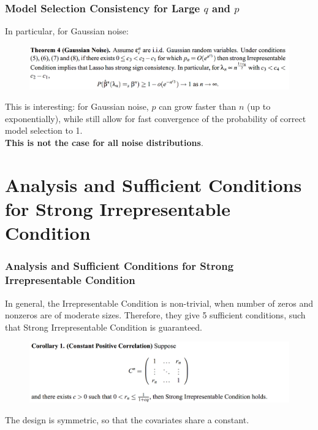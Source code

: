 \documentclass{beamer}
\begin{document}
	\begin{frame}
		\frametitle{Model Selection Consistency for Large $q$ and $p$}
		In particular, for Gaussian noise:
		\begin{figure}
			\includegraphics[width=1\linewidth]{image009.png}
		\end{figure}
	
		This is interesting: for Gaussian noise, $p$ can grow faster than $n$ (up to exponentially), while still allow for fast convergence of the probability of correct model selection to 1.\\
		\vspace{\baselineskip}
		\textbf{This is not the case for all noise distributions}.
		
	\end{frame}
	
	\section{Analysis and Sufficient Conditions for Strong Irrepresentable Condition}
	
	\begin{frame}
		\frametitle{Analysis and Sufficient Conditions for Strong Irrepresentable Condition}
		In general, the Irrepresentable Condition is non-trivial, when number of zeros and nonzeros are of moderate sizes. Therefore, they give 5 sufficient conditions, such that Strong Irrepresentable Condition is guaranteed.
		\begin{figure}
			\includegraphics[width=1\linewidth]{image010.png}
		\end{figure}
		The design is symmetric, so that the covariates share a constant.
	\end{frame}
	
\end{document}
